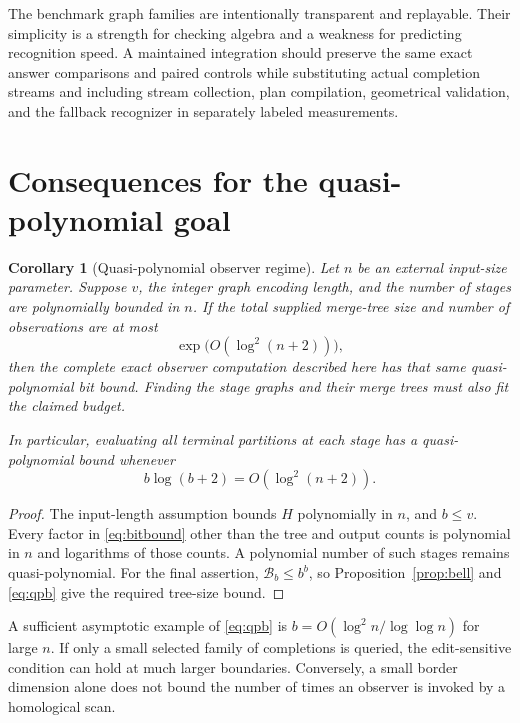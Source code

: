 \documentclass[11pt,letterpaper]{article}
\newtheorem{corollary}[theorem]{Corollary}
\theoremstyle{definition}\newtheorem{definition}[theorem]{Definition}
\theoremstyle{remark}\newtheorem{remark}[theorem]{Remark}
\begin{document}
The benchmark graph families are intentionally transparent and replayable. Their simplicity is a strength for checking algebra and a weakness for predicting recognition speed. A maintained integration should preserve the same exact answer comparisons and paired controls while substituting actual completion streams and including stream collection, plan compilation, geometrical validation, and the fallback recognizer in separately labeled measurements.

\section{Consequences for the quasi-polynomial goal}
\label{sec:qp}

\begin{corollary}[Quasi-polynomial observer regime]
\label{cor:qp}
Let $n$ be an external input-size parameter. Suppose $v$, the integer graph encoding length, and the number of stages are polynomially bounded in $n$. If the total supplied merge-tree size and number of observations are at most
\[
 \exp\!\bigl(O(\log^2(n+2))\bigr),
\]
then the complete exact observer computation described here has that same quasi-polynomial bit bound. Finding the stage graphs and their merge trees must also fit the claimed budget.

In particular, evaluating \emph{all} terminal partitions at each stage has a quasi-polynomial bound whenever
\begin{equation}
 b\log(b+2)=O(\log^2(n+2)).
 \label{eq:qpb}
\end{equation}
\end{corollary}
\begin{proof}
The input-length assumption bounds $H$ polynomially in $n$, and $b\leq v$. Every factor in \eqref{eq:bitbound} other than the tree and output counts is polynomial in $n$ and logarithms of those counts. A polynomial number of such stages remains quasi-polynomial. For the final assertion, $\mathcal B_b\leq b^b$, so Proposition~\ref{prop:bell} and \eqref{eq:qpb} give the required tree-size bound.
\end{proof}

A sufficient asymptotic example of \eqref{eq:qpb} is $b=O(\log^2 n/\log\log n)$ for large $n$. If only a small selected family of completions is queried, the edit-sensitive condition can hold at much larger boundaries. Conversely, a small border dimension alone does not bound the number of times an observer is invoked by a homological scan.
\end{document}
